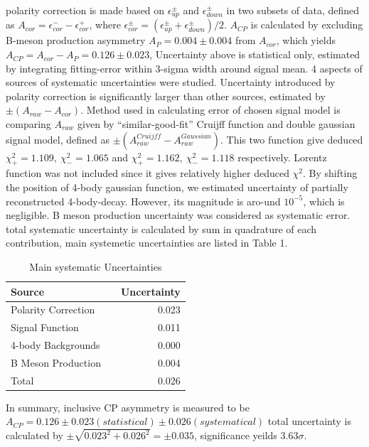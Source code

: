\documentclass[12pt, twoside, notitlepage, twocolumn]{article}
\begin{document}
        polarity correction is made based on $\epsilon^\pm_{up}$ and $\epsilon^\pm_{down}$ in two subsets of data, defined as 
        $A_{cor}=\epsilon_{cor}^--\epsilon_{cor}^+$, where $\epsilon_{cor}^\pm = (\epsilon^\pm_{up}+\epsilon^\pm_{down})/2$.
        $A_{CP}$ is calculated by excluding B-meson production asymmetry $A_P = 0.004\pm0.004$\cite{1310.4740} from $A_{cor}$, which 
        yields $A_{CP} = A_{cor} - A_P = 0.126 \pm 0.023$, Uncertainty above is statistical only, estimated by integrating 
        fitting-error within 3-sigma width around signal mean. 4 aspects of sources of systematic uncertainties were studied. Uncertainty 
        introduced by polarity correction is significantly larger than other sources, estimated by $\pm(A_{raw}-A_{cor})$. Method used in 
        calculating error of chosen signal model is comparing $A_{raw}$ given by ``similar-good-fit'' Cruijff function and double 
        gaussian signal model, defined as $\pm(A_{raw}^{Cruijff}-A_{raw}^{Gaussian})$. This two function give deduced 
        $\chi^2_+=1.109,\ \chi^2_-=1.065$ and $\chi^2_+=1.162,\ \chi^2_-=1.118$ respectively. Lorentz function was not included since it gives relatively 
        higher deduced $\chi^2$. By shifting the position of 4-body gaussian function, we estimated uncertainty of partially reconstructed 
        4-body-decay. However, its magnitude is aro-\newpage{}und $10^{-5}$, which is negligible. B meson production uncertainty was considered as 
        systematic error. total systematic uncertainty is calculated by sum in quadrature of each contribution, main systemetic
        uncertainties are listed in Table 1.
        \begin{table}[ht]
            \centering
            \caption{Main systematic Uncertainties}
            \begin{tabularx}{9.73cm}{lXr}
            \hline
            Source & & Uncertainty \\
            \hline
            Polarity Correction  & & 0.023 \\
            Signal Function  & & 0.011 \\
            4-body Backgrounds & & 0.000 \\
            B Meson Production & & 0.004 \\
            \hline
            Total & & 0.026 \\
            \hline
            \end{tabularx}
        \end{table}
        \newline In summary, inclusive CP asymmetry is measured to be $A_{CP} = 0.126\pm0.023(statistical)\pm0.026(systematical)$
        total uncertainty is calculated by $\pm \sqrt{0.023^2+0.026^2}=\pm 0.035$, significance yeilds $3.63\sigma$.
\end{document}
